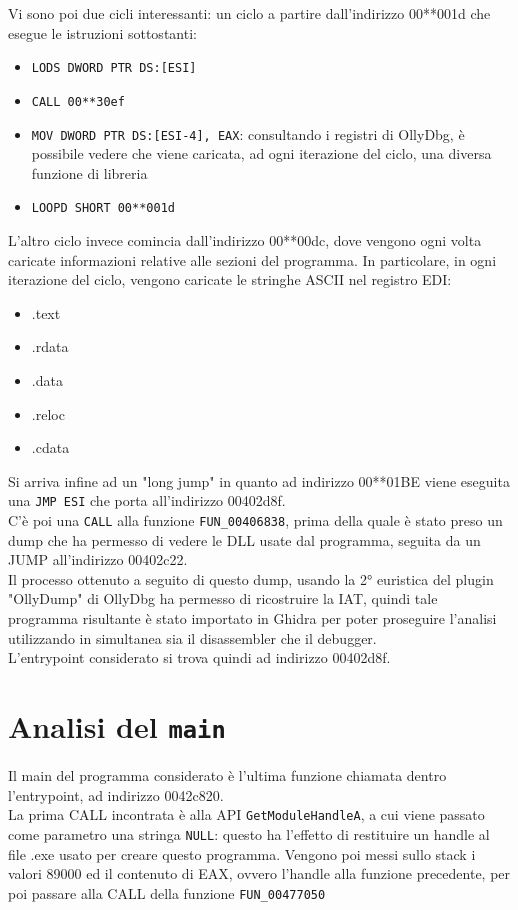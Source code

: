 \documentclass[12pt]{extarticle}
\begin{document}
Vi sono poi due cicli interessanti:
un ciclo a partire dall'indirizzo 00**001d che esegue le istruzioni sottostanti:
\begin{itemize}
    \item \texttt{LODS DWORD PTR DS:[ESI]}
    \item \texttt{CALL 00**30ef}
    \item \texttt{MOV DWORD PTR DS:[ESI-4], EAX}: consultando i registri di OllyDbg, è possibile vedere che viene caricata, ad ogni iterazione del ciclo, una diversa funzione di libreria
    \item \texttt{LOOPD SHORT 00**001d}
\end{itemize}   
L'altro ciclo invece comincia dall'indirizzo 00**00dc, dove vengono ogni volta caricate informazioni relative alle sezioni del programma. In particolare, in ogni iterazione del ciclo, vengono caricate le stringhe ASCII nel registro EDI:
\begin{itemize}
    \item .text
    \item .rdata
    \item .data
    \item .reloc 
    \item .cdata
\end{itemize}
Si arriva infine ad un "long jump" in quanto ad indirizzo 00**01BE viene eseguita una \texttt{JMP ESI} che porta all'indirizzo 00402d8f.\\C'è poi una \texttt{CALL} alla funzione \texttt{FUN\_00406838}, prima della quale è stato preso un dump che ha permesso di vedere le DLL usate dal programma, seguita da un JUMP all'indirizzo 00402c22.\\Il processo ottenuto a seguito di questo dump, usando la 2° euristica del plugin "OllyDump" di OllyDbg ha permesso di ricostruire la IAT, quindi tale programma risultante è stato importato in Ghidra per poter proseguire l'analisi utilizzando in simultanea sia il disassembler che il debugger.\\L'entrypoint considerato si trova quindi ad indirizzo 00402d8f.\\

\section{Analisi del \texttt{main}}
Il main del programma considerato è l'ultima funzione chiamata dentro l'entrypoint, ad indirizzo 0042c820.\\La prima CALL incontrata è alla API \texttt{GetModuleHandleA}, a cui viene passato come parametro una stringa \texttt{NULL}: questo ha l'effetto di restituire un handle al file .exe usato per creare questo programma. Vengono poi messi sullo stack i valori 89000 ed il contenuto di EAX, ovvero l'handle alla funzione precedente, per poi passare alla CALL della funzione \texttt{FUN\_00477050}
\end{document}
